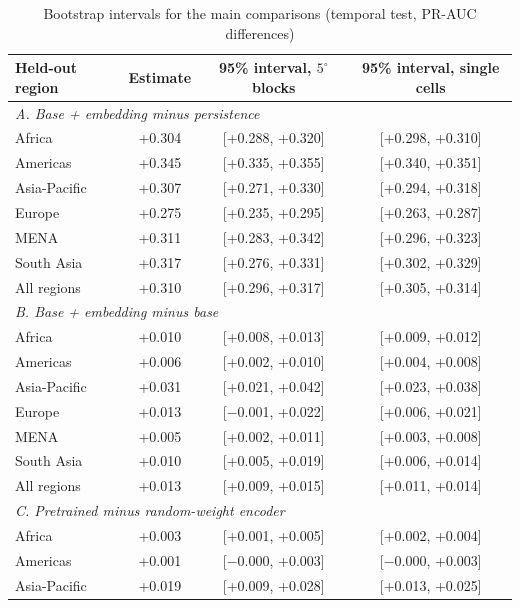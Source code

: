 \begin{table}[!htbp]
\centering\footnotesize
\caption{Bootstrap intervals for the main comparisons (temporal test, PR-AUC differences)}
\label{tab:boot_main}
\begin{tabular}{lccc}
\hline
Held-out region & Estimate & 95\% interval, $5^\circ$ blocks & 95\% interval, single cells \\
\hline
\multicolumn{4}{l}{\textit{A. Base + embedding minus persistence}} \\
Africa & +0.304 & [+0.288, +0.320] & [+0.298, +0.310] \\
Americas & +0.345 & [+0.335, +0.355] & [+0.340, +0.351] \\
Asia-Pacific & +0.307 & [+0.271, +0.330] & [+0.294, +0.318] \\
Europe & +0.275 & [+0.235, +0.295] & [+0.263, +0.287] \\
MENA & +0.311 & [+0.283, +0.342] & [+0.296, +0.323] \\
South Asia & +0.317 & [+0.276, +0.331] & [+0.302, +0.329] \\
All regions & +0.310 & [+0.296, +0.317] & [+0.305, +0.314] \\
\hline
\multicolumn{4}{l}{\textit{B. Base + embedding minus base}} \\
Africa & +0.010 & [+0.008, +0.013] & [+0.009, +0.012] \\
Americas & +0.006 & [+0.002, +0.010] & [+0.004, +0.008] \\
Asia-Pacific & +0.031 & [+0.021, +0.042] & [+0.023, +0.038] \\
Europe & +0.013 & [$-$0.001, +0.022] & [+0.006, +0.021] \\
MENA & +0.005 & [+0.002, +0.011] & [+0.003, +0.008] \\
South Asia & +0.010 & [+0.005, +0.019] & [+0.006, +0.014] \\
All regions & +0.013 & [+0.009, +0.015] & [+0.011, +0.014] \\
\hline
\multicolumn{4}{l}{\textit{C. Pretrained minus random-weight encoder}} \\
Africa & +0.003 & [+0.001, +0.005] & [+0.002, +0.004] \\
Americas & +0.001 & [$-$0.000, +0.003] & [$-$0.000, +0.003] \\
Asia-Pacific & +0.019 & [+0.009, +0.028] & [+0.013, +0.025] \\

\end{tabular}
\end{table}
